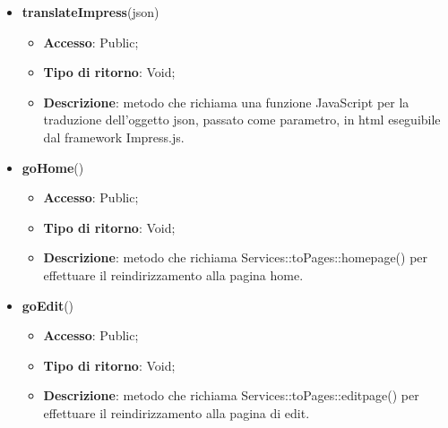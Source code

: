 {{\begin{itemize}
\begin{itemize}
			\item \textbf{Tipo di ritorno}: Void;
			\item \textbf{Descrizione}: evento che permette l'interazione tra Angular.js e Impress.js. Dato che il framework Impress.js cambia l'url della pagina in modo dinamico, è necessario istruire il routing di Angular su come comportarsi, in modo tale che non ci sia alcun reindirizzamento inopportuno.
		\end{itemize}
		\item \textbf{translateImpress}(json)
		\begin{itemize}
			\item \textbf{Accesso}: Public;
			\item \textbf{Tipo di ritorno}: Void;
			\item \textbf{Descrizione}: metodo che richiama una funzione JavaScript per la traduzione dell'oggetto json, passato come parametro, in html eseguibile dal framework Impress.js.
		\end{itemize}
		\item \textbf{goHome}()
		\begin{itemize}
			\item \textbf{Accesso}: Public;
			\item \textbf{Tipo di ritorno}: Void;
			\item \textbf{Descrizione}: metodo che richiama Services::\-toPages::\-homepage() per effettuare il reindirizzamento alla pagina home.
		\end{itemize}
		\item \textbf{goEdit}()
		\begin{itemize}
			\item \textbf{Accesso}: Public;
			\item \textbf{Tipo di ritorno}: Void;
			\item \textbf{Descrizione}: metodo che richiama Services::\-toPages::\-editpage() per effettuare il reindirizzamento alla pagina di edit.
		\end{itemize}
	\end{itemize}
}
}

